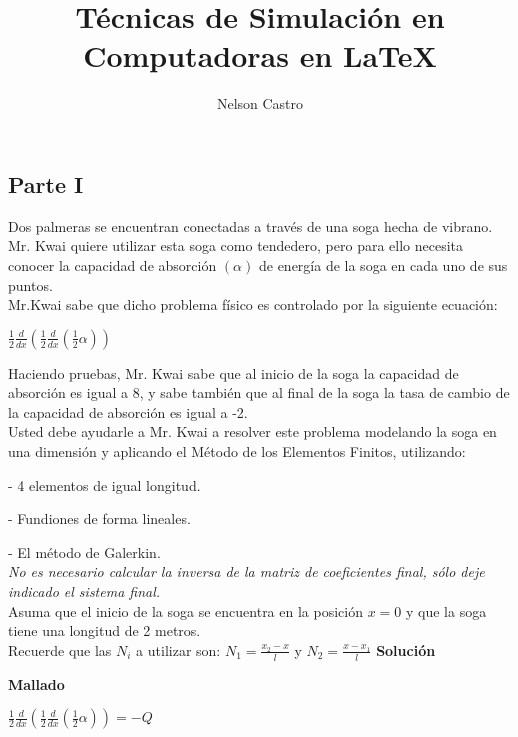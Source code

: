 \documentclass[12pt]{report}
\title{Técnicas de Simulación en Computadoras en \LaTeX}
\author{Nelson Castro}
\begin{document}
        \maketitle
        \newpage
        \subsection*{\bfseries \large Parte I}
        Dos palmeras se encuentran conectadas a través de una soga hecha de vibrano. Mr. Kwai quiere utilizar esta soga como tendedero, pero para ello necesita conocer la capacidad de absorción $(\alpha)$ de energía de la soga en cada uno de sus puntos.
        \\Mr.Kwai sabe que dicho problema físico es controlado por la siguiente ecuación:

        \begin{center}
            $\displaystyle \frac{1}{2}\frac{d}{dx}\left( \frac{1}{2}\frac{d}{dx}\left(\frac{1}{2}\alpha\right)\right)$
        \end{center}
        Haciendo pruebas, Mr. Kwai sabe que al inicio de la soga la capacidad de absorción es igual a 8, y sabe también que al final de la soga la tasa de cambio de la capacidad de absorción es igual a -2.
        \\Usted debe ayudarle a Mr. Kwai a resolver este problema modelando la soga en una dimensión y aplicando el Método de los Elementos Finitos, utilizando: 
        
        - 4 elementos de igual longitud.
        
        - Fundiones de forma lineales.
        
        - El método de Galerkin.
        \\ \textit{No es necesario calcular la inversa de la matriz de coeficientes final, sólo deje indicado el sistema final.}
        \\Asuma que el inicio de la soga se encuentra en la posición $x = 0$ y que la soga tiene una longitud de 2 metros.
        \\Recuerde que las $N_i$ a utilizar son: $\displaystyle N_1 = \frac{x_2-x}{l}$ y $\displaystyle N_2 = \frac{x-x_1}{l}$
        \newpage
        \textbf{Solución}
        
        \centering \textbf{Mallado}
        \begin{center}
            $\displaystyle \frac{1}{2}\frac{d}{dx}\left(\frac{1}{2}\frac{d}{dx}\left(\frac{1}{2}\alpha\right)\right) = -Q$
        \end{center}
\end{document}
